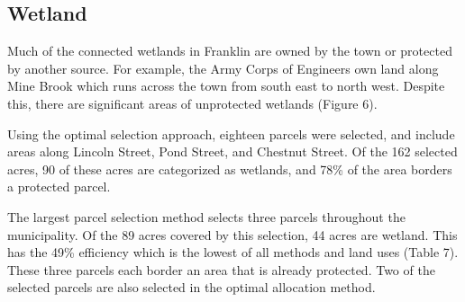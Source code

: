 \documentclass[12pt, stu, floatsintext,table]{apa7}
\begin{document}
\begin{table}[hbtp]
\caption{Summary of forested parcel selections using three methods.} 
\end{table}
\subsection{Wetland}
Much of the connected wetlands in Franklin are owned by the town or protected by another source. For example, the Army Corps of Engineers own land along Mine Brook which runs across the town from south east to north west. Despite this, there are significant areas of unprotected wetlands (Figure 6).  

Using the optimal selection approach, eighteen parcels were selected, and include areas along Lincoln Street, Pond Street, and Chestnut Street. Of the 162 selected acres, 90 of these acres are categorized as wetlands, and 78\% of the area borders a protected parcel. 

The largest parcel selection method selects three parcels throughout the municipality. Of the 89 acres covered by this selection, 44 acres are wetland. This has the 49\% efficiency which is the lowest of all methods and land uses (Table 7). These three parcels each border an area that is already protected. Two of the selected parcels are also selected in the optimal allocation method. 
\end{document}
